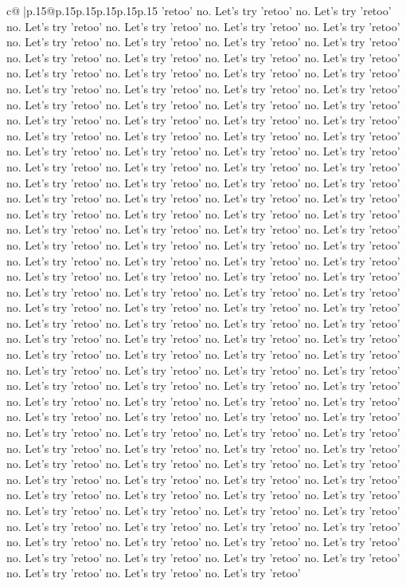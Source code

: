 \documentclass{article}
\begin{document}
{\begin{supertabular}{c@{$\;$}|p{.15\linewidth}@{}p{.15\linewidth}p{.15\linewidth}p{.15\linewidth}p{.15\linewidth}p{.15\linewidth}}
{{{'retoo' no. Let's try 'retoo' no. Let's try 'retoo' no. Let's try 'retoo' no. Let's try 'retoo' no. Let's try 'retoo' no. Let's try 'retoo' no. Let's try 'retoo' no. Let's try 'retoo' no. Let's try 'retoo' no. Let's try 'retoo' no. Let's try 'retoo' no. Let's try 'retoo' no. Let's try 'retoo' no. Let's try 'retoo' no. Let's try 'retoo' no. Let's try 'retoo' no. Let's try 'retoo' no. Let's try 'retoo' no. Let's try 'retoo' no. Let's try 'retoo' no. Let's try 'retoo' no. Let's try 'retoo' no. Let's try 'retoo' no. Let's try 'retoo' no. Let's try 'retoo' no. Let's try 'retoo' no. Let's try 'retoo' no. Let's try 'retoo' no. Let's try 'retoo' no. Let's try 'retoo' no. Let's try 'retoo' no. Let's try 'retoo' no. Let's try 'retoo' no. Let's try 'retoo' no. Let's try 'retoo' no. Let's try 'retoo' no. Let's try 'retoo' no. Let's try 'retoo' no. Let's try 'retoo' no. Let's try 'retoo' no. Let's try 'retoo' no. Let's try 'retoo' no. Let's try 'retoo' no. Let's try 'retoo' no. Let's try 'retoo' no. Let's try 'retoo' no. Let's try 'retoo' no. Let's try 'retoo' no. Let's try 'retoo' no. Let's try 'retoo' no. Let's try 'retoo' no. Let's try 'retoo' no. Let's try 'retoo' no. Let's try 'retoo' no. Let's try 'retoo' no. Let's try 'retoo' no. Let's try 'retoo' no. Let's try 'retoo' no. Let's try 'retoo' no. Let's try 'retoo' no. Let's try 'retoo' no. Let's try 'retoo' no. Let's try 'retoo' no. Let's try 'retoo' no. Let's try 'retoo' no. Let's try 'retoo' no. Let's try 'retoo' no. Let's try 'retoo' no. Let's try 'retoo' no. Let's try 'retoo' no. Let's try 'retoo' no. Let's try 'retoo' no. Let's try 'retoo' no. Let's try 'retoo' no. Let's try 'retoo' no. Let's try 'retoo' no. Let's try 'retoo' no. Let's try 'retoo' no. Let's try 'retoo' no. Let's try 'retoo' no. Let's try 'retoo' no. Let's try 'retoo' no. Let's try 'retoo' no. Let's try 'retoo' no. Let's try 'retoo' no. Let's try 'retoo' no. Let's try 'retoo' no. Let's try 'retoo' no. Let's try 'retoo' no. Let's try 'retoo' no. Let's try 'retoo' no. Let's try 'retoo' no. Let's try 'retoo' no. Let's try 'retoo' no. Let's try 'retoo' no. Let's try 'retoo' no. Let's try 'retoo' no. Let's try 'retoo' no. Let's try 'retoo' no. Let's try 'retoo' no. Let's try 'retoo' no. Let's try 'retoo' no. Let's try 'retoo' no. Let's try 'retoo' no. Let's try 'retoo' no. Let's try 'retoo' no. Let's try 'retoo' no. Let's try 'retoo' no. Let's try 'retoo' no. Let's try 'retoo' no. Let's try 'retoo' no. Let's try 'retoo' no. Let's try 'retoo' no. Let's try 'retoo' no. Let's try 'retoo' no. Let's try 'retoo' no. Let's try 'retoo' no. Let's try 'retoo' no. Let's try 'retoo' no. Let's try 'retoo' no. Let's try 'retoo' no. Let's try 'retoo' no. Let's try 'retoo' no. Let's try 'retoo' no. Let's try 'retoo' no. Let's try 'retoo' no. Let's try 'retoo' no. Let's try 'retoo' no. Let's try 'retoo' no. Let's try 'retoo' no. Let's try 'retoo' no. Let's try 'retoo' no. Let's try 'retoo' no. Let's try 'retoo' no. Let's try 'retoo' no. Let's try 'retoo' no. Let's try 'retoo' no. Let's try 'retoo' no. Let's try 'retoo' no. Let's try 'retoo' no. Let's try 'retoo' no. Let's try 'retoo' no. Let's try 'retoo' no. Let's try 'retoo' no. Let's try 'retoo' }}}
\end{supertabular}}
\end{document}
